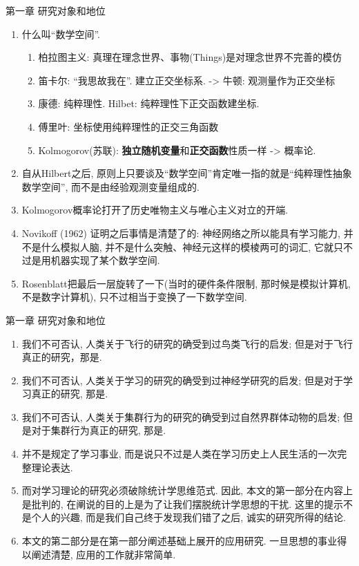 \documentclass[compress,10pt,dvipsnames,notheorems]{beamer} %
\begin{document}
\begin{frame}{第一章 研究对象和地位}
\begin{solu}
\begin{enumerate}
\item 什么叫“数学空间”.
\begin{enumerate}
\item 柏拉图主义: 真理在理念世界、事物(Things)是对理念世界不完善的模仿
\item 笛卡尔: “我思故我在”. 建立正交坐标系. -> 牛顿: 观测量作为正交坐标
\item 康德: 纯粹理性. Hilbet: 纯粹理性下正交函数建坐标.
\item 傅里叶: 坐标使用纯粹理性的正交三角函数
\item Kolmogorov(苏联): \textbf{独立随机变量}和\textbf{正交函数}性质一样 -> 概率论.
\end{enumerate}
\item 自从Hilbert之后, 原则上只要谈及“数学空间”肯定唯一指的就是“纯粹理性抽象数学空间”, 而不是由经验观测变量组成的.
\item Kolmogorov概率论打开了历史唯物主义与唯心主义对立的开端.
\item Novikoff (1962) 证明之后事情是清楚了的: 神经网络之所以能具有学习能力, 并不是什么模拟人脑, 并不是什么突触、神经元这样的模棱两可的词汇, 它就只不过是用机器实现了某个数学空间.
\item Rosenblatt把最后一层旋转了一下(当时的硬件条件限制, 那时候是模拟计算机, 不是数字计算机), 只不过相当于变换了一下数学空间.
\end{enumerate}
\end{solu}
\end{frame}

\begin{frame}{第一章 研究对象和地位}
\begin{solu}
\begin{enumerate}
\pause
\item 我们不可否认, 人类关于飞行的研究的确受到过鸟类飞行的启发; 但是对于飞行真正的研究，那是{\color{red}{空气动力学的事业}}.
\pause
\item 我们不可否认, 人类关于学习的研究的确受到过神经学研究的启发; 但是对于学习真正的研究, 那是{\color{red}{统计学习理论的事业}}.
\item 我们不可否认, 人类关于集群行为的研究的确受到过自然界群体动物的启发; 但是对于集群行为真正的研究, 那是{\color{red}{统计学习理论的事业}}.
\pause
\item 并不是{\color{red}{统计学习理论}}规定了学习事业, 而是说{\color{red}{统计学习理论}}只不过是人类在学习历史上人民生活的一次完整理论表达.
\item 而对学习理论的研究必须破除统计学思维范式. 因此, 本文的第一部分在内容上是批判的, 在阐说的目的上是为了让我们摆脱统计学思想的干扰. 这里的提示不是个人的兴趣, 而是我们自己终于发现我们错了之后, 诚实的研究所得的结论.
\pause
\item 本文的第二部分是在第一部分阐述基础上展开的应用研究. 一旦思想的事业得以阐述清楚, 应用的工作就非常简单. 
\end{enumerate}
\end{solu}
\end{frame}
\end{document}
